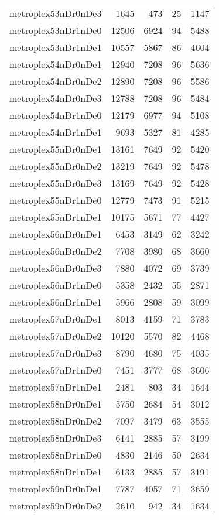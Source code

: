\begin{longtable}{lrrrr}
metroplex53nDr0nDe3 & 1645 & 473 & 25 & 1147 \\
metroplex53nDr1nDe0 & 12506 & 6924 & 94 & 5488 \\
metroplex53nDr1nDe1 & 10557 & 5867 & 86 & 4604 \\
metroplex54nDr0nDe1 & 12940 & 7208 & 96 & 5636 \\
metroplex54nDr0nDe2 & 12890 & 7208 & 96 & 5586 \\
metroplex54nDr0nDe3 & 12788 & 7208 & 96 & 5484 \\
metroplex54nDr1nDe0 & 12179 & 6977 & 94 & 5108 \\
metroplex54nDr1nDe1 & 9693 & 5327 & 81 & 4285 \\
metroplex55nDr0nDe1 & 13161 & 7649 & 92 & 5420 \\
metroplex55nDr0nDe2 & 13219 & 7649 & 92 & 5478 \\
metroplex55nDr0nDe3 & 13169 & 7649 & 92 & 5428 \\
metroplex55nDr1nDe0 & 12779 & 7473 & 91 & 5215 \\
metroplex55nDr1nDe1 & 10175 & 5671 & 77 & 4427 \\
metroplex56nDr0nDe1 & 6453 & 3149 & 62 & 3242 \\
metroplex56nDr0nDe2 & 7708 & 3980 & 68 & 3660 \\
metroplex56nDr0nDe3 & 7880 & 4072 & 69 & 3739 \\
metroplex56nDr1nDe0 & 5358 & 2432 & 55 & 2871 \\
metroplex56nDr1nDe1 & 5966 & 2808 & 59 & 3099 \\
metroplex57nDr0nDe1 & 8013 & 4159 & 71 & 3783 \\
metroplex57nDr0nDe2 & 10120 & 5570 & 82 & 4468 \\
metroplex57nDr0nDe3 & 8790 & 4680 & 75 & 4035 \\
metroplex57nDr1nDe0 & 7451 & 3777 & 68 & 3606 \\
metroplex57nDr1nDe1 & 2481 & 803 & 34 & 1644 \\
metroplex58nDr0nDe1 & 5750 & 2684 & 54 & 3012 \\
metroplex58nDr0nDe2 & 7097 & 3479 & 63 & 3555 \\
metroplex58nDr0nDe3 & 6141 & 2885 & 57 & 3199 \\
metroplex58nDr1nDe0 & 4830 & 2146 & 50 & 2634 \\
metroplex58nDr1nDe1 & 6133 & 2885 & 57 & 3191 \\
metroplex59nDr0nDe1 & 7787 & 4057 & 71 & 3659 \\
metroplex59nDr0nDe2 & 2610 & 942 & 34 & 1634 \\

\end{longtable}
